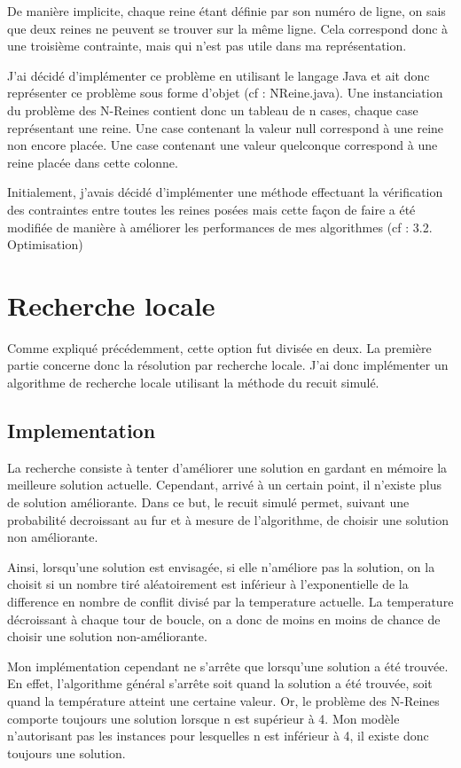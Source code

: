 \documentclass[a4paper,10pt]{article}
\begin{document}
De manière implicite, chaque reine étant définie par son numéro de ligne, on sais que deux reines ne peuvent se trouver sur la même ligne. Cela correspond donc à une troisième contrainte, mais qui n'est pas utile dans ma représentation.

J'ai décidé d'implémenter ce problème en utilisant le langage Java et ait donc représenter ce problème sous forme d'objet (cf : NReine.java). Une instanciation du problème des N-Reines contient donc un tableau de n cases, chaque case représentant une reine. Une case contenant la valeur null correspond à une reine non encore placée. Une case contenant une valeur quelconque correspond à une reine placée dans cette colonne.

Initialement, j'avais décidé d'implémenter une méthode effectuant la vérification des contraintes entre toutes les reines posées mais cette façon de faire a été modifiée de manière à améliorer les performances de mes algorithmes (cf : 3.2. Optimisation)

\section{Recherche locale}

Comme expliqué précédemment, cette option fut divisée en deux. La première partie concerne donc la résolution par recherche locale. J'ai donc implémenter un algorithme de recherche locale utilisant la méthode du recuit simulé.

\subsection{Implementation}

La recherche consiste à tenter d'améliorer une solution en gardant en mémoire la meilleure solution actuelle. Cependant, arrivé à un certain point, il n'existe plus de solution améliorante. Dans ce but, le recuit simulé permet, suivant une probabilité decroissant au fur et à mesure de l'algorithme, de choisir une solution non améliorante.

Ainsi, lorsqu'une solution est envisagée, si elle n'améliore pas la solution, on la choisit si un nombre tiré aléatoirement est inférieur à l'exponentielle de la difference en nombre de conflit divisé par la temperature actuelle. La temperature décroissant à chaque tour de boucle, on a donc de moins en moins de chance de choisir une solution non-améliorante.

Mon implémentation cependant ne s'arrête que lorsqu'une solution a été trouvée. En effet, l'algorithme général s'arrête soit quand la solution a été trouvée, soit quand la température atteint une certaine valeur. Or, le problème des N-Reines comporte toujours une solution lorsque n est supérieur à 4. Mon modèle n'autorisant pas les instances pour lesquelles n est inférieur à 4, il existe donc toujours une solution.
\end{document}

